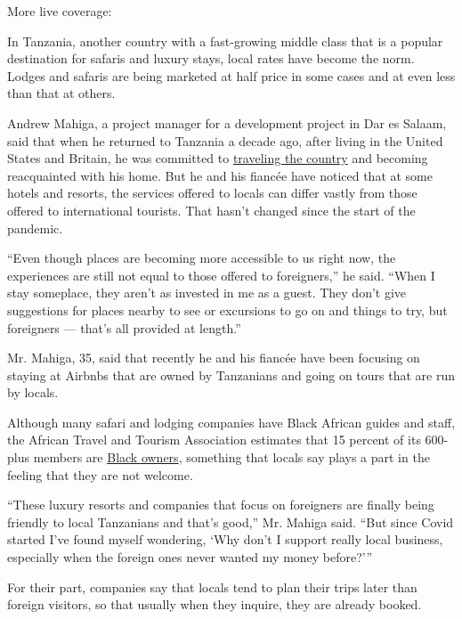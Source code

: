 More live coverage:

In Tanzania, another country with a fast-growing middle class that is a
popular destination for safaris and luxury stays, local rates have
become the norm. Lodges and safaris are being marketed at half price in
some cases and at even less than that at others.

Andrew Mahiga, a project manager for a development project in Dar es
Salaam, said that when he returned to Tanzania a decade ago, after
living in the United States and Britain, he was committed to
\href{https://www.instagram.com/drudysseus/?hl=en}{traveling the
country} and becoming reacquainted with his home. But he and his fiancée
have noticed that at some hotels and resorts, the services offered to
locals can differ vastly from those offered to international tourists.
That hasn't changed since the start of the pandemic.

``Even though places are becoming more accessible to us right now, the
experiences are still not equal to those offered to foreigners,'' he
said. ``When I stay someplace, they aren't as invested in me as a guest.
They don't give suggestions for places nearby to see or excursions to go
on and things to try, but foreigners --- that's all provided at
length.''

Mr. Mahiga, 35, said that recently he and his fiancée have been focusing
on staying at Airbnbs that are owned by Tanzanians and going on tours
that are run by locals.

Although many safari and lodging companies have Black African guides and
staff, the African Travel and Tourism Association estimates that 15
percent of its 600-plus members are
\href{https://www.cntraveller.com/article/locally-owned-safari-camps}{Black
owners}, something that locals say plays a part in the feeling that they
are not welcome.

``These luxury resorts and companies that focus on foreigners are
finally being friendly to local Tanzanians and that's good,'' Mr. Mahiga
said. ``But since Covid started I've found myself wondering, `Why don't
I support really local business, especially when the foreign ones never
wanted my money before?'''

For their part, companies say that locals tend to plan their trips later
than foreign visitors, so that usually when they inquire, they are
already booked.

\href{https://www.nytimes3xbfgragh.onion/news-event/coronavirus?action=click\&pgtype=Article\&state=default\&region=MAIN_CONTENT_3\&context=storylines_faq}{}

